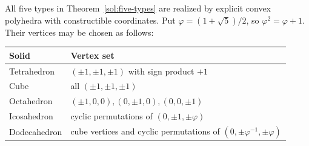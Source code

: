 \begin{theorem}\label{sol:realizations}
All five types in Theorem~\ref{sol:five-types} are realized by explicit
convex polyhedra with constructible coordinates. Put
$\varphi=(1+\sqrt5)/2$, so $\varphi^2=\varphi+1$.
Their vertices may be chosen as follows:
\begin{center}\small
\begin{tabular}{ll}
\toprule
Solid & Vertex set\\
\midrule
Tetrahedron & $(\pm1,\pm1,\pm1)$ with sign product $+1$\\
Cube & all $(\pm1,\pm1,\pm1)$\\
Octahedron & $(\pm1,0,0),(0,\pm1,0),(0,0,\pm1)$\\
Icosahedron & cyclic permutations of $(0,\pm1,\pm\varphi)$\\
Dodecahedron & cube vertices and cyclic permutations of
$(0,\pm\varphi^{-1},\pm\varphi)$\\
\bottomrule
\end{tabular}
\end{center}
\end{theorem}
